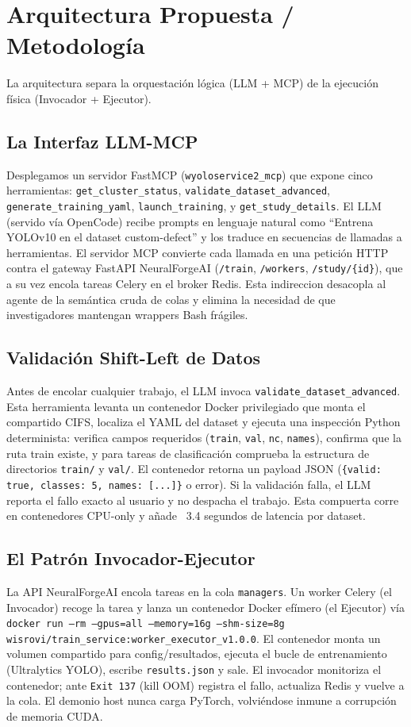 \documentclass[10pt,twocolumn,letterpaper]{article}
\begin{document}
\section{Arquitectura Propuesta / Metodología}
La arquitectura separa la orquestación lógica (LLM + MCP) de la ejecución física (Invocador + Ejecutor).

\subsection{La Interfaz LLM-MCP}
Desplegamos un servidor FastMCP (\texttt{wyoloservice2\_mcp}) que expone cinco herramientas: \texttt{get\_cluster\_status}, \texttt{validate\_dataset\_advanced}, \texttt{generate\_training\_yaml}, \texttt{launch\_training}, y \texttt{get\_study\_details}. El LLM (servido vía OpenCode) recibe prompts en lenguaje natural como ``Entrena YOLOv10 en el dataset custom-defect'' y los traduce en secuencias de llamadas a herramientas. El servidor MCP convierte cada llamada en una petición HTTP contra el gateway FastAPI NeuralForgeAI (\texttt{/train}, \texttt{/workers}, \texttt{/study/\{id\}}), que a su vez encola tareas Celery en el broker Redis. Esta indireccion desacopla al agente de la semántica cruda de colas y elimina la necesidad de que investigadores mantengan wrappers Bash frágiles.

\subsection{Validación Shift-Left de Datos}
Antes de encolar cualquier trabajo, el LLM invoca \texttt{validate\_dataset\_advanced}. Esta herramienta levanta un contenedor Docker privilegiado que monta el compartido CIFS, localiza el YAML del dataset y ejecuta una inspección Python determinista: verifica campos requeridos (\texttt{train}, \texttt{val}, \texttt{nc}, \texttt{names}), confirma que la ruta train existe, y para tareas de clasificación comprueba la estructura de directorios \texttt{train/} y \texttt{val/}. El contenedor retorna un payload JSON (\texttt{\{valid: true, classes: 5, names: [...]\}} o error). Si la validación falla, el LLM reporta el fallo exacto al usuario y no despacha el trabajo. Esta compuerta corre en contenedores CPU-only y añade ~3.4 segundos de latencia por dataset.

\subsection{El Patrón Invocador-Ejecutor}
La API NeuralForgeAI encola tareas en la cola \texttt{managers}. Un worker Celery (el Invocador) recoge la tarea y lanza un contenedor Docker efímero (el Ejecutor) vía \texttt{docker run --rm --gpus=all --memory=16g --shm-size=8g wisrovi/train\_service:worker\_executor\_v1.0.0}. El contenedor monta un volumen compartido para config/resultados, ejecuta el bucle de entrenamiento (Ultralytics YOLO), escribe \texttt{results.json} y sale. El invocador monitoriza el contenedor; ante \texttt{Exit 137} (kill OOM) registra el fallo, actualiza Redis y vuelve a la cola. El demonio host nunca carga PyTorch, volviéndose inmune a corrupción de memoria CUDA.
\end{document}
